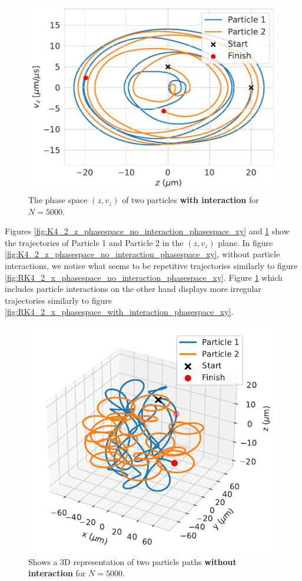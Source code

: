 \documentclass[english,notitlepage,reprint,nofootinbib]{revtex4-1}  %
\begin{document}
\begin{figure}[H]
    \centering
    \includegraphics[width=.5\textwidth]{../figures/phase_space_z_interaction_RK4_N5000.pdf}
    \caption{The phase space $(z, v_z)$ of two particles \textbf{
            with interaction} for $N = 5000$.}
    \label{fig:K4_2_z_phasespace_with_interaction_phasespace_xy}
\end{figure}
Figures \ref{fig:K4_2_z_phasespace_no_interaction_phasespace_xy} and \ref{fig:K4_2_z_phasespace_with_interaction_phasespace_xy}
show the trajectories of Particle 1 and Particle 2 in the $(z,v_z)$ plane. In figure \ref{fig:K4_2_z_phasespace_no_interaction_phasespace_xy},
without particle interactions, we notice what seems to be repetitive trajectories similarly to figure
\ref{fig:RK4_2_x_phasespace_no_interaction_phasespace_xy}. Figure \ref{fig:K4_2_z_phasespace_with_interaction_phasespace_xy}
which includes particle interactions on the other hand displays more irregular trajectories similarly to figure \ref{fig:RK4_2_x_phasespace_with_interaction_phasespace_xy}.

\begin{figure}[H]
    \centering
    \includegraphics[width=.5\textwidth]{../figures/3D_2_particles_RK4_N5000.pdf}
    \caption{Shows a 3D representation of two particle paths \textbf{without interaction} for $N = 5000$.}
    \label{fig:3D_2_particles_no_interaction}
\end{figure}
\end{document}
